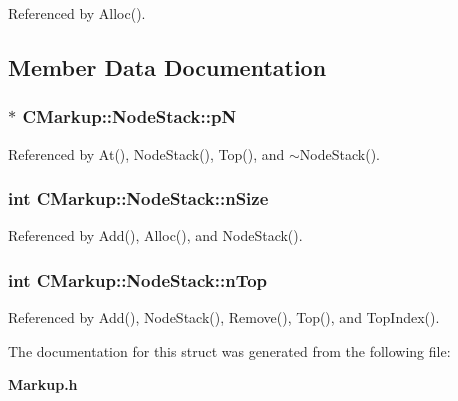 Referenced by Alloc().

\subsection{Member Data Documentation}
\subsubsection[pN]{$\ast$ {\bf CMarkup::NodeStack::pN}\hspace{0.3cm}{\tt  [protected]}}\label{structCMarkup_1_1NodeStack_636ddd56b9f0c53d1d8fb98d154b8ce3}




Referenced by At(), NodeStack(), Top(), and $\sim$NodeStack().
\subsubsection[nSize]{\setlength{\rightskip}{0pt plus 5cm}int {\bf CMarkup::NodeStack::nSize}\hspace{0.3cm}{\tt  [protected]}}\label{structCMarkup_1_1NodeStack_7031af9e6f3ceca049b5467b1fd7e478}




Referenced by Add(), Alloc(), and NodeStack().
\subsubsection[nTop]{\setlength{\rightskip}{0pt plus 5cm}int {\bf CMarkup::NodeStack::nTop}\hspace{0.3cm}{\tt  [protected]}}\label{structCMarkup_1_1NodeStack_f3e08fa5dce853a6267da9f77ef3f986}




Referenced by Add(), NodeStack(), Remove(), Top(), and TopIndex().

The documentation for this struct was generated from the following file:\begin{CompactItemize}
\item 
{\bf Markup.h}\end{CompactItemize}
